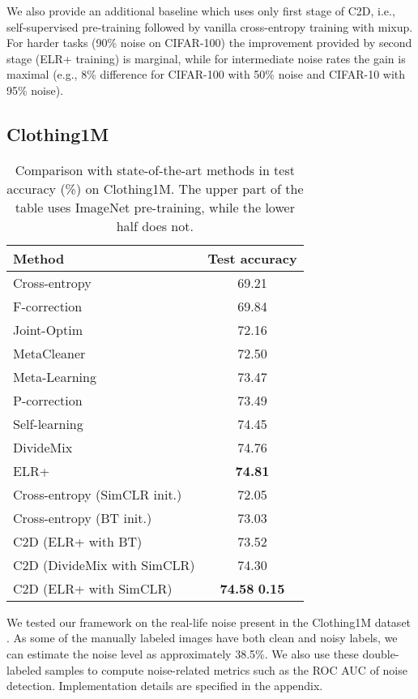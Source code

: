\documentclass[10pt,twocolumn,letterpaper]{article}
\renewcommand{\cite}[1]{\citep{#1}}
\newcommand{\eb}[1]{{\scriptsize\,\,#1}}
\begin{document}
We also provide an additional baseline which uses only first stage of C2D, i.e., self-supervised pre-training followed by vanilla cross-entropy training with mixup. For harder tasks (90\% noise on CIFAR-100) the improvement provided by second stage (ELR+ training) is marginal, while for intermediate noise rates the gain is maximal (e.g., 8\% difference for CIFAR-100 with 50\% noise and CIFAR-10 with 95\% noise).

\subsection{Clothing1M}

\begin{table}
	\centering
    \setlength\extrarowheight{2pt}
	\begin{tabular}	{l  c }
		\toprule	 	
			\textbf{Method } & \textbf{Test accuracy} \\
			\midrule			
			Cross-entropy & 69.21 \\
			F-correction \cite{patrini2017making}  &69.84\\	
Joint-Optim \cite{tanaka2018joint}  & 72.16\\			
			MetaCleaner \cite{zhang2019metacleaner} & 72.50\\
			Meta-Learning \cite{li2019learning}  & 73.47\\	
			P-correction \cite{yi2019pencil}&73.49\\
			Self-learning \cite{han2019deepself} & 74.45\\
			DivideMix \cite{li2020dividemix}& 74.76\\
			ELR+ \cite{liu2020earlylearning}& \textbf{74.81}\\
			\midrule
			Cross-entropy (SimCLR init.)	 & 72.05\\
			Cross-entropy (BT init.)	 & 73.03\\
			C2D (ELR+ with BT) & 73.52\\
			C2D (DivideMix with SimCLR) & 74.30\\
			C2D (ELR+ with SimCLR) & \textbf{74.58\eb{0.15}}\\
		\bottomrule
	\end{tabular}
\caption
		{
Comparison with state-of-the-art methods in test accuracy (\%) on Clothing1M. The upper part of the table uses ImageNet pre-training, while the lower half does not. }
	\label{tbl:clothing}
\end{table}

We tested our framework on the real-life noise present in the Clothing1M dataset \cite{xiao2015learning}.
As some of the  manually labeled images have both clean and noisy labels, we can estimate the noise level as approximately 38.5\%. We also use these double-labeled samples to compute noise-related metrics such as the ROC AUC of noise detection. 
Implementation details are specified in the appendix. 
\end{document}
